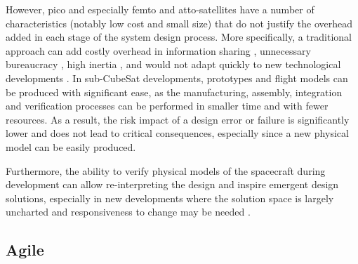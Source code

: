 \documentclass[journal,10pt]{IEEEtran}
\begin{document}
However, pico and especially femto and atto-satellites have a number of characteristics (notably low cost and small size) that do not justify the overhead added in each stage of the system design process. More specifically, a traditional approach can add costly overhead in information sharing \autocite{yassineInformationHidingProduct2003}, unnecessary bureaucracy \autocite{boehmBalancingAgilityDiscipline2004}, high inertia \autocite{carsonCanSystemsEngineering2013}, and would not adapt quickly to new technological developments \autocite{sebok_drivers}. In sub-CubeSat developments, prototypes and flight models can be produced with significant ease, as the manufacturing, assembly, integration and verification processes can be performed in smaller time and with fewer resources. As a result, the risk impact of a design error or failure is significantly lower and does not lead to critical consequences, especially since a new physical model can be easily produced.

Furthermore, the ability to verify physical models of the spacecraft during development can allow re-interpreting the design and inspire emergent design solutions, especially in new developments where the solution space is largely uncharted and responsiveness to change may be needed \autocite{dorstCoevolutionEmergenceDesign2019}.


\subsection{Agile}
\label{sec:agilee}
\end{document}
